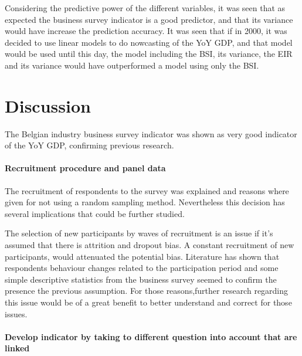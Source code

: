 \documentclass[12pt,a4paper,oneside]{book}
\begin{document}
Considering the predictive power of the different variables, it was seen that as expected the business survey indicator is a good predictor, and that its variance would have increase the prediction accuracy.
It was seen that if in 2000, it was decided to use linear models to do nowcasting of the YoY GDP, and that model would be used until this day, the model including the BSI, its variance, the EIR and its variance would have outperformed a model using only the BSI.



\chapter{Discussion}

The Belgian industry business survey indicator was shown as very good indicator of the YoY GDP, confirming previous research.


\subsubsection{Recruitment procedure and panel data}

The recruitment of respondents to the survey was explained and reasons where given for not using a random sampling method. Nevertheless this decision has several implications that could be further studied.

The selection of new participants by waves of recruitment is an issue if it's assumed that there is attrition and dropout bias.
A constant recruitment of new participants, would attenuated the potential bias. 
Literature has shown that respondents behaviour changes related to the participation period and some simple descriptive statistics from the business survey seemed to confirm the presence the previous assumption. For those reasons,further research regarding this issue would be of a great benefit to better understand and correct for those issues.

\subsubsection{Develop indicator by taking to different question into account that are linked}
\end{document}
